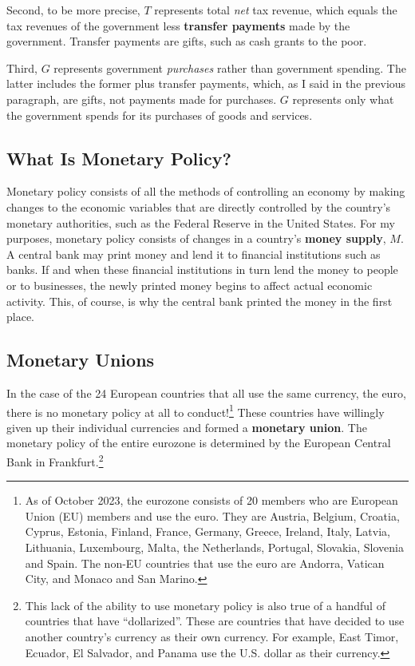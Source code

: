\documentclass[
  letterpaper,
]{book}
\begin{document}
Second, to be more precise, \(T\) represents total \emph{net} tax
revenue, which equals the tax revenues of the government less
\textbf{transfer payments} made by the government. Transfer payments are
gifts, such as cash grants to the poor.

Third, \(G\) represents government \emph{purchases} rather than
government spending. The latter includes the former plus transfer
payments, which, as I said in the previous paragraph, are gifts, not
payments made for purchases. \(G\) represents only what the government
spends for its purchases of goods and services.

\subsection{What Is Monetary Policy?}\label{sec-monetary}

Monetary policy consists of all the
methods of controlling an economy by making changes to the economic
variables that are directly controlled by the country's monetary
authorities, such as the Federal Reserve in the United States. For my
purposes, monetary policy consists of changes in a country's
\textbf{money supply}, \(M\). A central bank may print money and lend it
to financial institutions such as banks. If and when these financial
institutions in turn lend the money to people or to businesses, the
newly printed money begins to affect actual economic activity. This, of
course, is why the central bank printed the money in the first place.

\subsection{Monetary Unions}\label{sec-monetary-unions}

In the case of the 24 European countries that all use the same currency,
the euro, there is no monetary policy at all to conduct!\footnote{As of
  October 2023, the eurozone consists of 20 members who are European
  Union (EU) members and use the euro. They are Austria, Belgium,
  Croatia, Cyprus, Estonia, Finland, France, Germany, Greece, Ireland,
  Italy, Latvia, Lithuania, Luxembourg, Malta, the Netherlands,
  Portugal, Slovakia, Slovenia and Spain. The non-EU countries that use
  the euro are Andorra, Vatican City, and Monaco and San Marino.} These
countries have willingly given up their individual currencies and formed
a \textbf{monetary union}. The monetary
policy of the entire eurozone is determined by the European Central
Bank in Frankfurt.\footnote{This
  lack of the ability to use monetary policy is also true of a handful
  of countries that have ``dollarized''. These are
  countries that have decided to use another country's currency as their
  own currency. For example, East Timor, Ecuador, El Salvador, and
  Panama use the U.S. dollar as their currency.}
\end{document}
